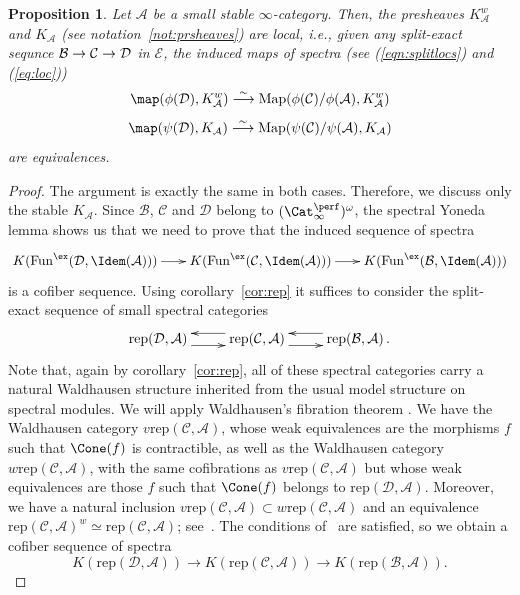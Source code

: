 \documentclass{amsart}
\renewcommand{\to}{\mathchoice{\longrightarrow}{\rightarrow}{\rightarrow}{\rightarrow}}
\newcommand{\cA}{{\mathcal A}}
\newcommand{\cB}{{\mathcal B}}
\newcommand{\cC}{{\mathcal C}}
\newcommand{\cD}{{\mathcal D}}
\let\catsymbfont\mathcal
\newcommand{\aA}{{\catsymbfont{A}}}
\newcommand{\aB}{{\catsymbfont{B}}}
\newcommand{\aC}{{\catsymbfont{C}}}
\newcommand{\aD}{{\catsymbfont{D}}}
\newcommand{\aE}{{\catsymbfont{E}}}
\newcommand{\idemstabcat}{\Cat_\i^{\perf}}
\newcommand{\idemfun}{\Fun^{\ex}}
\newcommand{\Fun}{\mathrm{Fun}} %
\newcommand{\Map}{\mathrm{Map}}%
\newcommand{\too}{\longrightarrow}%
\renewcommand{\i}{\infty}
\newcommand{\rep}{\mathrm{rep}} %
\numberwithin{equation}{section}
\newtheorem{proposition}[equation]{Proposition}
\theoremstyle{definition}
\begin{document}
\begin{proposition}\label{prop:local}
Let $\cA$ be a small stable $\i$-category. Then, the presheaves
$K^{w}_{\aA}$ and $K_{\aA}$ (see notation~\ref{not:prsheaves}) are
local, i.e., given any split-exact sequnce $\aB \to \aC \to \aD$ in
$\aE$, the induced maps of spectra (see (\ref{eqn:splitlocs}) and
(\ref{eq:loc}))
$$ \map(\phi(\cD), K^w_{\aA}) \stackrel{\sim}{\too} \Map(\phi(\cC)/\phi(\cA), K^w_{\aA})$$
$$ \map(\psi(\cD), K_{\aA}) \stackrel{\sim}{\too} \Map(\psi(\cC)/\psi(\aA), K_{\aA})$$
are equivalences.
\end{proposition}

\begin{proof}
The argument is exactly the same in both cases. Therefore, we discuss
only the stable $K_{\aA}$.  Since $\cB$, $\cC$ and $\cD$
belong to $(\idemstabcat)^\omega$, the spectral Yoneda lemma shows us
that we need to prove that the induced sequence of spectra
\[
\xymatrix@-0.5pc{
K(\idemfun(\cD, \Idem(\cA))) \ar[r] & K(\idemfun(\aC, \Idem(\aA))) \ar[r]
& K(\idemfun(\aB, \Idem(\aA)))\\
}
\]
is a cofiber sequence.
Using corollary~\ref{cor:rep} it suffices to consider
the split-exact sequence of small spectral categories
\[
\xymatrix{
\rep(\cD, \cA) \ar@<-1ex>[r] & \rep(\aC, \cA)  \ar@<-1ex>[l]
\ar@<-1ex>[r] & \rep(\aB, \cA) \ar@<-1ex>[l] \,.
}
\]
Note that, again by corollary~\ref{cor:rep}, all of these
spectral categories carry a natural Waldhausen structure inherited
from the usual model structure on spectral modules.  We will
apply Waldhausen's fibration theorem \cite[1.6.4]{Wald}.  We have 
the Waldhausen category $v\rep(\aC,\cA)$, whose weak
equivalences are the morphisms $f$ such that $\Cone(f)$ is
contractible, as well as the Waldhausen category
$w\rep(\aC,\cA)$, with the same cofibrations as
$v\rep(\aC,\cA)$ but whose weak equivalences are those
$f$ such that $\Cone(f)$ belongs to
$\rep(\cD,\cA)$. Moreover, we have a natural inclusion
$v\rep(\aC,\cA) \subset w\rep(\aC,\cA)$ and an equivalence
$\rep(\aC,\cA)^w \simeq \rep(\cC,\cA)$; see~\cite[\S\,1.6]{Wald}. 
The conditions of~\cite[1.6.4]{Wald}
are satisfied, so we obtain a cofiber sequence of spectra
\[
K(\rep(\cD,\cA)) \too K(\rep(\aC,\cA)) \too K(\rep(\aB,\cA)).
\]
\end{proof}
\end{document}

